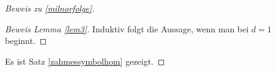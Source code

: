 \documentclass[ngerman,fontsize=11pt, paper=a4, parskip=half, titlepage=true, toc=bib]{scrartcl}
\begin{document}
\begin{proof}[Beweis zu \ref{milnorfolge}]
\begin{proof}[Beweis Lemma \ref{lem3}]
    Induktiv folgt die Aussage, wenn man bei $d=1$ beginnt.
  \end{proof}

  
  Es ist Satz \ref{zahmessymbolhom} gezeigt.
\end{proof}





\printindex

\nocite{*}
\printbibliography
\end{document}
